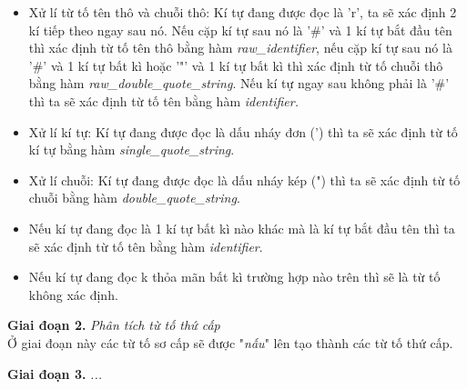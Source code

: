 \begin{itemize}
  \item Xử lí từ tố tên thô và chuỗi thô: Kí tự đang được đọc là 'r', ta sẽ xác định 2 kí 
  tiếp theo ngay sau nó. Nếu cặp kí tự sau nó là '\#' và 1 kí tự bắt đầu tên thì xác định 
  từ tố tên thô bằng hàm \textit{raw\_identifier}, nếu cặp kí tự sau nó là '\#' và 1 kí 
  tự bất kì hoặc '"' và 1 kí tự bất kì thì xác định từ tố chuỗi thô bằng hàm 
  \textit{raw\_double\_quote\_string}. Nếu kí tự ngay sau không phải là '\#' thì ta sẽ xác 
  định từ tố tên bằng hàm \textit{identifier.}
  \item Xử lí kí tự: Kí tự đang được đọc là dấu nháy đơn (') thì ta sẽ xác định từ tố kí 
  tự bằng hàm \textit{single\_quote\_string}.
  \item Xử lí chuỗi: Kí tự đang được đọc là dấu nháy kép (") thì ta sẽ xác định từ tố 
  chuỗi bằng hàm \textit{double\_quote\_string}.
  \item Nếu kí tự đang đọc là 1 kí tự bất kì nào khác mà là kí tự bắt đầu tên thì ta sẽ 
  xác định từ tố tên bằng hàm \textit{identifier}.
  \item Nếu kí tự đang đọc k thỏa mãn bất kì trường hợp nào trên thì sẽ là từ tố không 
  xác định.
\end{itemize}


\textbf{Giai đoạn 2.} \textit{Phân tích từ tố thứ cấp}\\
Ở giai đoạn này các từ tố sơ cấp sẽ được "\textit{nấu}" lên tạo thành các từ tố thứ cấp.




\textbf{Giai đoạn 3.} \textit{...}
